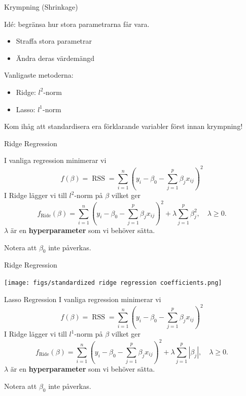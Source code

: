 \documentclass[10pt,english]{beamer}
\begin{document}
\begin{frame}{Krympning (Shrinkage)}
    
    Idé: begränsa hur stora parametrarna får vara.
    \begin{itemize}
        \item Straffa stora parametrar
        \item Ändra deras värdemängd
    \end{itemize}
    Vanligaste metoderna:
    \begin{itemize}
        \item Ridge: $l^2$-norm
        \item Lasso: $l^1$-norm
    \end{itemize}

    Kom ihåg att standardisera era förklarande variabler först innan krympning!

\end{frame}

\begin{frame}{Ridge Regression}

    I vanliga regression minimerar vi
    \begin{equation*}
        f(\beta) = \operatorname{RSS} = \sum_{i=1}^{n}\left(y_i - \beta_0 - \sum_{j=1}^{p}\beta_j x_{ij}\right)^2
    \end{equation*}
    I Ridge lägger vi till $l^2$-norm på $\beta$ vilket ger
    \begin{equation*}
        f_{\text{Ride}}(\beta) = \sum_{i=1}^{n}\left(y_i - \beta_0 - \sum_{j=1}^{p}\beta_j x_{ij}\right)^2 + \lambda \sum_{j=1}^{p} \beta_j^2, \quad \lambda \geq 0.
    \end{equation*}
    $\lambda$ är en \textbf{hyperparameter} som vi behöver sätta.

    Notera att $\beta_0$ inte påverkas.
    
\end{frame}

\begin{frame}{Ridge Regression}

    \texttt{[image: figs/standardized ridge regression coefficients.png]}
    
\end{frame}

\begin{frame}{Lasso Regression}
    I vanliga regression minimerar vi
    \begin{equation*}
        f(\beta) = \operatorname{RSS} = \sum_{i=1}^{n}\left(y_i - \beta_0 - \sum_{j=1}^{p}\beta_j x_{ij}\right)^2
    \end{equation*}
    I Ridge lägger vi till $l^1$-norm på $\beta$ vilket ger
    \begin{equation*}
        f_{\text{Ride}}(\beta) = \sum_{i=1}^{n}\left(y_i - \beta_0 - \sum_{j=1}^{p}\beta_j x_{ij}\right)^2 + \lambda \sum_{j=1}^{p} |\beta_j|, \quad \lambda \geq 0.
    \end{equation*}
    $\lambda$ är en \textbf{hyperparameter} som vi behöver sätta.

    Notera att $\beta_0$ inte påverkas.
\end{frame}
\end{document}

